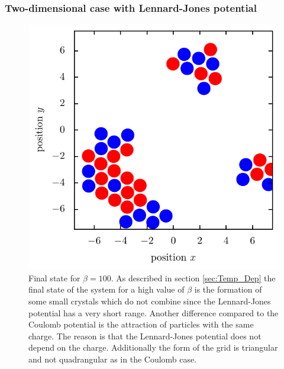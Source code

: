 \documentclass[11pt, a4paper]{article}
\numberwithin{equation}{section}
\begin{document}
\subsubsection{Two-dimensional case with Lennard-Jones potential}

\begin{figure}[!h]
\centering
\includegraphics[scale=1]{figures/Beta_100_LJ.pdf}
\caption{Final state for $\beta = 100$.
As described in section \ref{sec:Temp_Dep} the final state of the system for a high value of $\beta$ is the formation of some small crystals which do not combine since the Lennard-Jones potential has a very short range.
Another difference compared to the Coulomb potential is the attraction of particles with the same charge.
The reason is that the Lennard-Jones potential does not depend on the charge.
Additionally the form of the grid is triangular and not quadrangular as in the Coulomb case.
}
\end{figure}
\end{document}
